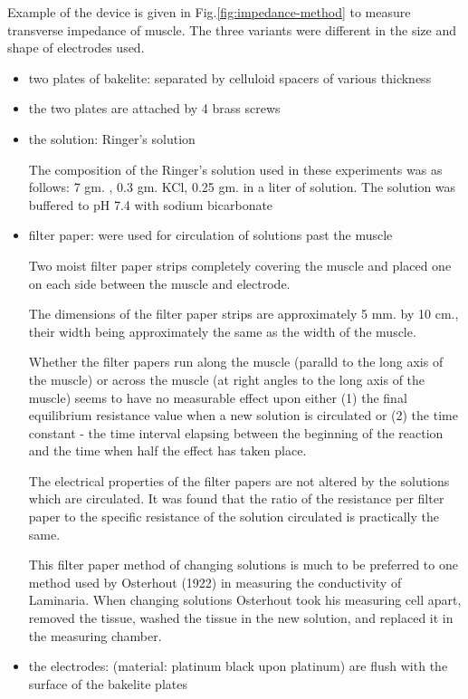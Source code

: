 Example of the device is given in Fig.\ref{fig:impedance-method} to measure
transverse impedance of muscle. The three variants were different in the size
and shape of electrodes used.
\begin{itemize}
  \item two plates of bakelite: separated by celluloid spacers of various
  thickness
  
  \item the two plates are attached by 4 brass screws
  
  \item the solution: Ringer's solution
  
The composition of the Ringer's solution used in these experiments
was as follows: 7 gm. , 0.3 gm. KCl, 0.25 gm.  in a liter
of solution. The solution was buffered to pH 7.4 with sodium bicarbonate

  \item filter paper: were used for circulation of solutions past the muscle

Two moist filter paper strips completely covering the muscle and placed one on
each side between the muscle and electrode. 

The dimensions of the filter paper strips are approximately 5 mm. by 10 cm.,
their width being approximately the same as the width of the muscle.

Whether the filter papers run along the muscle (paralld to the long axis of the
muscle) or across the muscle (at right angles to the long axis of the muscle)
seems to have no measurable effect upon either (1) the final equilibrium
resistance value when a new solution is circulated or (2) the time constant -
the time interval elapsing between the beginning of the reaction and the time
when half the effect has taken place.

The electrical properties of the filter papers are not altered by the solutions
which are circulated. It was found that the ratio of the resistance per filter
paper to the specific resistance of the solution circulated is practically the
same.

This filter paper method of changing solutions is much to be preferred to one
method used by Osterhout (1922) in measuring the conductivity of Laminaria.
When changing solutions Osterhout took his measuring cell apart, removed the
tissue, washed the tissue in the new solution, and replaced it in the measuring
chamber.
    
  \item the electrodes: (material: platinum black upon platinum) are flush with
  the surface of the bakelite plates
  

\end{itemize}
